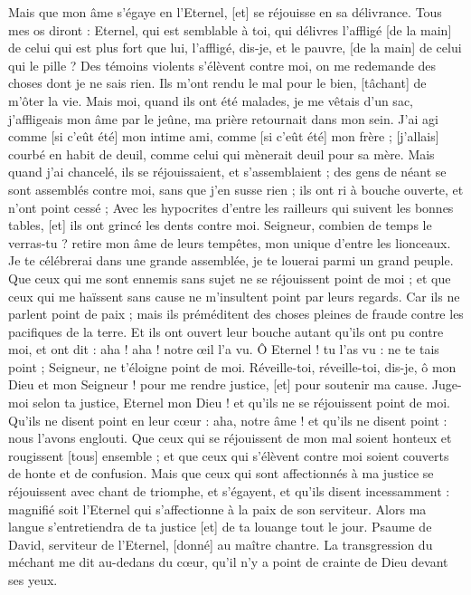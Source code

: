 \begin{multicols}{2}
Mais que mon âme s'égaye en l'Eternel, [et] se réjouisse en sa délivrance.
Tous mes os diront : Eternel, qui est semblable à toi, qui délivres l'affligé [de la main] de celui qui est plus fort que lui, l'affligé, dis-je, et le pauvre, [de la main] de celui qui le pille ?
Des témoins violents s'élèvent contre moi, on me redemande des choses dont je ne sais rien.
Ils m'ont rendu le mal pour le bien, [tâchant] de m'ôter la vie.
Mais moi, quand ils ont été malades, je me vêtais d'un sac, j'affligeais mon âme par le jeûne, ma prière retournait dans mon sein.
J'ai agi comme [si c'eût été] mon intime ami, comme [si c'eût été] mon frère ; [j'allais] courbé en habit de deuil, comme celui qui mènerait deuil pour sa mère.
Mais quand j'ai chancelé, ils se réjouissaient, et s'assemblaient ; des gens de néant se sont assemblés contre moi, sans que j'en susse rien ; ils ont ri à bouche ouverte, et n'ont point cessé ;
Avec les hypocrites d'entre les railleurs qui suivent les bonnes tables, [et] ils ont grincé les dents contre moi.
Seigneur, combien de temps le verras-tu ? retire mon âme de leurs tempêtes, mon unique d'entre les lionceaux.
Je te célébrerai dans une grande assemblée, je te louerai parmi un grand peuple.
Que ceux qui me sont ennemis sans sujet ne se réjouissent point de moi ; et que ceux qui me haïssent sans cause ne m'insultent point par leurs regards.
Car ils ne parlent point de paix ; mais ils préméditent des choses pleines de fraude contre les pacifiques de la terre.
Et ils ont ouvert leur bouche autant qu'ils ont pu contre moi, et ont dit : aha ! aha ! notre œil l'a vu.
Ô Eternel ! tu l'as vu : ne te tais point ; Seigneur, ne t'éloigne point de moi.
Réveille-toi, réveille-toi, dis-je, ô mon Dieu et mon Seigneur ! pour me rendre justice, [et] pour soutenir ma cause.
Juge-moi selon ta justice, Eternel mon Dieu ! et qu'ils ne se réjouissent point de moi.
Qu'ils ne disent point en leur cœur : aha, notre âme ! et qu'ils ne disent point : nous l'avons englouti.
Que ceux qui se réjouissent de mon mal soient honteux et rougissent [tous] ensemble ; et que ceux qui s'élèvent contre moi soient couverts de honte et de confusion.
Mais que ceux qui sont affectionnés à ma justice se réjouissent avec chant de triomphe, et s'égayent, et qu'ils disent incessamment : magnifié soit l'Eternel qui s'affectionne à la paix de son serviteur.
Alors ma langue s'entretiendra de ta justice [et] de ta louange tout le jour.
\VerseOne{}Psaume de David, serviteur de l'Eternel, [donné] au maître chantre. La transgression du méchant me dit au-dedans du cœur, qu'il n'y a point de crainte de Dieu devant ses yeux.

\end{multicols}
